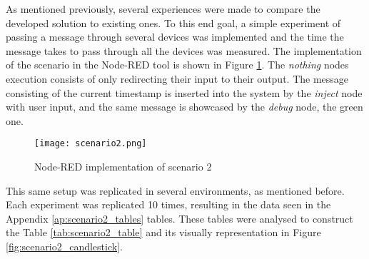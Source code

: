 As mentioned previously, several experiences were made to compare the developed solution to existing ones. To this end goal, a simple experiment of passing a message through several devices was implemented and the time the message takes to pass through all the devices was measured. The implementation of the scenario in the Node-RED tool is shown in Figure \ref{fig:scenario2_node_red}. The \textit{nothing} nodes execution consists of only redirecting their input to their output. The message consisting of the current timestamp is inserted into the system by the \textit{inject} node with user input, and the same message is showcased by the \textit{debug} node, the green one.

\begin{figure}[h]
\centering
\texttt{[image: scenario2.png]}
\caption[Node-RED implementation of scenario 2]{Node-RED implementation of scenario 2}\label{fig:scenario2_node_red}
\end{figure}

This same setup was replicated in several environments, as mentioned before. Each experiment was replicated 10 times, resulting in the data seen in the Appendix \ref{ap:scenario2_tables} tables. These tables were analysed to construct the Table \ref{tab:scenario2_table} and its visually representation in Figure \ref{fig:scenario2_candlestick}.

\captionsetup{belowskip=12pt,aboveskip=4pt}
\begin{table}[ht]
    \centering
    \caption{Scenario 2 results}
    \label{tab:scenario2_table}
\end{table}{}

